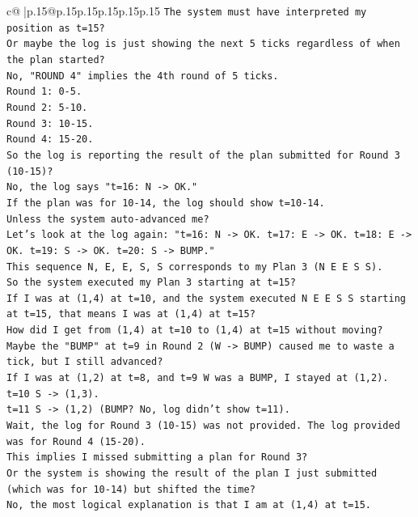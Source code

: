 \documentclass{article}
\begin{document}
{\begin{supertabular}{c@{$\;$}|p{.15\linewidth}@{}p{.15\linewidth}p{.15\linewidth}p{.15\linewidth}p{.15\linewidth}p{.15\linewidth}}
{{{\texttt{The system must have interpreted my position as t=15?} \\
\texttt{Or maybe the log is just showing the next 5 ticks regardless of when the plan started?} \\
\texttt{No, "ROUND 4" implies the 4th round of 5 ticks.} \\
\texttt{Round 1: 0{-}5.} \\
\texttt{Round 2: 5{-}10.} \\
\texttt{Round 3: 10{-}15.} \\
\texttt{Round 4: 15{-}20.} \\
\texttt{So the log is reporting the result of the plan submitted for Round 3 (10{-}15)?} \\
\texttt{No, the log says "t=16: N {-}> OK."} \\
\texttt{If the plan was for 10{-}14, the log should show t=10{-}14.} \\
\texttt{Unless the system auto{-}advanced me?} \\
\texttt{Let's look at the log again: "t=16: N {-}> OK. t=17: E {-}> OK. t=18: E {-}> OK. t=19: S {-}> OK. t=20: S {-}> BUMP."} \\
\texttt{This sequence N, E, E, S, S corresponds to my Plan 3 (N E E S S).} \\
\texttt{So the system executed my Plan 3 starting at t=15?} \\
\texttt{If I was at (1,4) at t=10, and the system executed N E E S S starting at t=15, that means I was at (1,4) at t=15?} \\
\texttt{How did I get from (1,4) at t=10 to (1,4) at t=15 without moving?} \\
\texttt{Maybe the "BUMP" at t=9 in Round 2 (W {-}> BUMP) caused me to waste a tick, but I still advanced?} \\
\texttt{If I was at (1,2) at t=8, and t=9 W was a BUMP, I stayed at (1,2).} \\
\texttt{t=10 S {-}> (1,3).} \\
\texttt{t=11 S {-}> (1,2) (BUMP? No, log didn't show t=11).} \\
\texttt{Wait, the log for Round 3 (10{-}15) was not provided. The log provided was for Round 4 (15{-}20).} \\
\texttt{This implies I missed submitting a plan for Round 3?} \\
\texttt{Or the system is showing the result of the plan I just submitted (which was for 10{-}14) but shifted the time?} \\
\texttt{No, the most logical explanation is that I am at (1,4) at t=15.} \\
}}}
\end{supertabular}}
\end{document}
